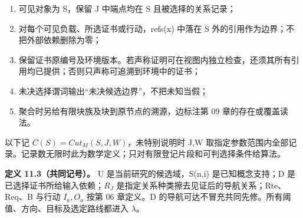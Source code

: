 \documentclass[UTF8,a4paper,zihao=-4,fontset=windows,openany]{ctexbook}
\def\mathrm#1{#1}%
\begin{document}
\begin{enumerate}
\item 可见对象为 S，保留 J 中端点均在 S 且被选择的关系记录；
\item 对每个可见负载、所选证书或行动，refs(x) 中落在 S 外的引用作为边界；不把外部依赖删除为零；
\item 保留证书原编号及环境版本。若声称证明可在视图内独立检查，还须其所有引用均已提供；否则只声称可追溯到环境中的证书；
\item 未决选择谓词输出“未决候选边界”，不把未知当假；
\item 聚合时另给有限块族及块到原节点的溯源，边标注第 09 章的存在或覆盖读法。
\end{enumerate}
以下记 \(C(S)=\mathrm{Cut}_M(S,J,W)\)，未特别说明时 J,W 取指定参数范围内全部记录。记录数无限时此为数学定义；只对有限登记片段和可判选择条件给算法。

\textbf{定义 11.3（共同记号）。} U 是当前研究的候选域，S(n,i) 是已知概念支持；D 是已选择证书所给输入依赖；\(R_J\) 是指定关系种类擦去见证后的导航关系；Rte、Req、B 与行动 \(I_a,O_a\) 按第 06 章定义。D 的导航可达不冒充共同先修。所有阈值、方向、目标及选定路线都进入 \(\lambda\)。
\end{document}
